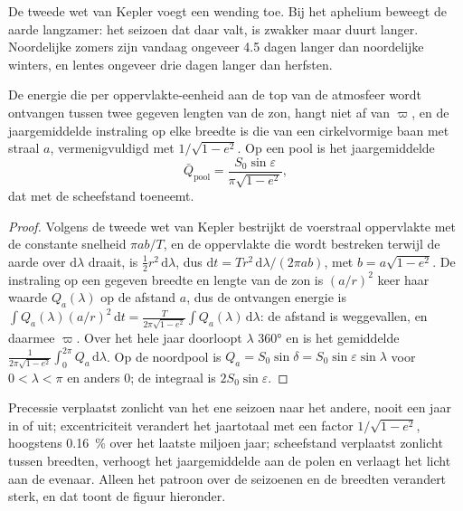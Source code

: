 De tweede wet van Kepler voegt een wending toe. Bij het aphelium beweegt de aarde langzamer: het seizoen dat
daar valt, is zwakker maar duurt langer. Noordelijke zomers zijn vandaag ongeveer 4.5 dagen langer dan noordelijke
winters, en lentes ongeveer drie dagen langer dan herfsten.

\begin{proposition}\label{prop:b2:orbital-forcing:annual}
De energie die per oppervlakte-eenheid aan de top van de atmosfeer wordt ontvangen tussen twee gegeven lengten van
de zon, hangt niet af van $\varpi$, en de jaargemiddelde instraling op elke breedte is die van een
cirkelvormige baan met straal $a$, vermenigvuldigd met $1/\sqrt{1 - e^2}$. Op een pool is het jaargemiddelde
\[
  \bar Q_{\text{pool}} = \frac{S_0\sin\varepsilon}{\pi\sqrt{1 - e^2}} ,
\]
dat met de scheefstand toeneemt.
\end{proposition}

\begin{proof}
Volgens de tweede wet van Kepler bestrijkt de voerstraal oppervlakte met de constante snelheid $\pi ab/T$, en de oppervlakte die wordt bestreken
terwijl de aarde over $\mathrm d\lambda$ draait, is $\frac12 r^2\,\mathrm d\lambda$, dus $\mathrm dt =
T r^2\,\mathrm d\lambda/(2\pi ab)$, met $b = a\sqrt{1 - e^2}$. De instraling op een gegeven breedte
en lengte van de zon is $(a/r)^2$ keer haar waarde $Q_a(\lambda)$ op de afstand $a$, dus de
ontvangen energie is $\int Q_a(\lambda)(a/r)^2\,\mathrm dt = \frac{T}{2\pi\sqrt{1 - e^2}}\int
Q_a(\lambda)\,\mathrm d\lambda$: de afstand is weggevallen, en daarmee $\varpi$. Over het hele
jaar doorloopt $\lambda$ \ang{360} en is het gemiddelde $\frac{1}{2\pi\sqrt{1-e^2}}\int_0^{2\pi}
Q_a\,\mathrm d\lambda$. Op de noordpool is $Q_a = S_0\sin\delta = S_0\sin\varepsilon\sin\lambda$
voor $0 < \lambda < \pi$ en anders 0; de integraal is $2S_0\sin\varepsilon$.
\end{proof}

Precessie verplaatst zonlicht van het ene seizoen naar het andere, nooit een jaar in of uit; excentriciteit
verandert het jaartotaal met een factor $1/\sqrt{1 - e^2}$, hoogstens \qty{0.16}{\percent} over het
laatste miljoen jaar; scheefstand verplaatst zonlicht tussen breedten, verhoogt het jaargemiddelde aan de
polen en verlaagt het licht aan de evenaar. Alleen het patroon over de seizoenen en de breedten verandert
sterk, en dat toont de figuur hieronder.

